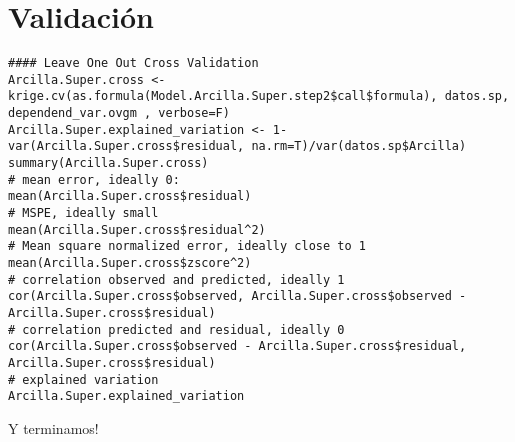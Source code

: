 \documentclass[10pt,a4paper]{article}
\begin{document}
\section{Validación}
\begin{lstlisting}
#### Leave One Out Cross Validation
Arcilla.Super.cross <- krige.cv(as.formula(Model.Arcilla.Super.step2$call$formula), datos.sp, dependend_var.ovgm , verbose=F)
Arcilla.Super.explained_variation <- 1-var(Arcilla.Super.cross$residual, na.rm=T)/var(datos.sp$Arcilla)
summary(Arcilla.Super.cross)
# mean error, ideally 0:
mean(Arcilla.Super.cross$residual)
# MSPE, ideally small
mean(Arcilla.Super.cross$residual^2)
# Mean square normalized error, ideally close to 1
mean(Arcilla.Super.cross$zscore^2)
# correlation observed and predicted, ideally 1
cor(Arcilla.Super.cross$observed, Arcilla.Super.cross$observed - Arcilla.Super.cross$residual)
# correlation predicted and residual, ideally 0
cor(Arcilla.Super.cross$observed - Arcilla.Super.cross$residual, Arcilla.Super.cross$residual)
# explained variation
Arcilla.Super.explained_variation
\end{lstlisting}

Y terminamos!
  

\end{document}
